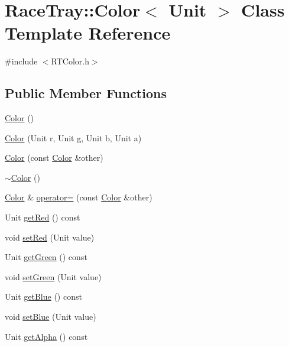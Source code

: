 \hypertarget{class_race_tray_1_1_color}{\section{Race\-Tray\-:\-:Color$<$ Unit $>$ Class Template Reference}
\label{class_race_tray_1_1_color}
}


{\ttfamily \#include $<$R\-T\-Color.\-h$>$}

\subsection*{Public Member Functions}
\begin{DoxyCompactItemize}
\item 
\hyperlink{group___math_ga9a742cbe9f9f4037f5d9f4e81a9b2428}{Color} ()
\item 
\hyperlink{group___math_gad9c19651c0feb39d14efb0bf957c9cf9}{Color} (Unit r, Unit g, Unit b, Unit a)
\item 
\hyperlink{group___math_ga866f5b3f4192cdd953900b3bdae4b2cd}{Color} (const \hyperlink{class_race_tray_1_1_color}{Color} \&other)
\item 
\hyperlink{group___math_ga3cfce6c6821d3bf489e26074c55378c0}{$\sim$\-Color} ()
\item 
\hyperlink{class_race_tray_1_1_color}{Color} \& \hyperlink{group___math_ga495cb1736fef1e5306e572365203ff42}{operator=} (const \hyperlink{class_race_tray_1_1_color}{Color} \&other)
\item 
Unit \hyperlink{class_race_tray_1_1_color_ab8e031b4a93a561509213d92d026dbbe}{get\-Red} () const 
\item 
void \hyperlink{class_race_tray_1_1_color_a07407c9dc5450e4d3edd11ca8fc0a5d6}{set\-Red} (Unit value)
\item 
Unit \hyperlink{class_race_tray_1_1_color_a73be96b524d361182fdef4aaaca34f9b}{get\-Green} () const 
\item 
void \hyperlink{class_race_tray_1_1_color_a1ad38db0398efaea9737c56f55d14030}{set\-Green} (Unit value)
\item 
Unit \hyperlink{class_race_tray_1_1_color_a2fdec11353b58a1b5e59bb87594206dd}{get\-Blue} () const 
\item 
void \hyperlink{class_race_tray_1_1_color_a0033768eb09b5cd90a780b34830ac577}{set\-Blue} (Unit value)
\item 
Unit \hyperlink{class_race_tray_1_1_color_a72a884a0a1a2fe2e406ff2ab012360f5}{get\-Alpha} () const 
\item 

\end{DoxyCompactItemize}
